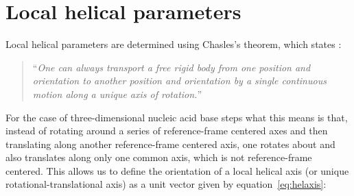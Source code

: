 
\section{Local helical parameters}

Local helical parameters are determined using Chasles's theorem, which
states \cite{babcock1994}:
\begin{quote}
``\textit{One can  always transport  a free rigid  body from one  position and
  orientation  to  another  position   and  orientation  by  a  single
  continuous motion along a unique axis of rotation.}''
\end{quote}

\noindent For  the case of  three-dimensional nucleic acid  base steps
what  this means  is  that, instead  of  rotating around  a series  of
reference-frame  centered  axes  and  then translating  along  another
reference-frame centered  axis, one rotates about  and also translates
along   only   one  common   axis,   which   is  not   reference-frame
centered. This allows us to  define the orientation of a local helical
axis (or unique rotational-translational  axis) as a unit vector given
by equation~\ref{eq:helaxis}:

